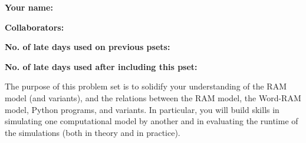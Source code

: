 \documentclass[11pt]{article}
\begin{document}

\textbf{Your name: }

\textbf{Collaborators: }

\textbf{No. of late days used on previous psets: }

\textbf{No. of late days used after including this pset: }


The purpose of this problem set is to solidify your understanding of the RAM model (and variants), and the relations between the RAM model, the Word-RAM model, Python programs, and variants. In particular, you will build skills in simulating one computational model by another and in evaluating the runtime of the simulations (both in theory and in practice).
\end{document}
